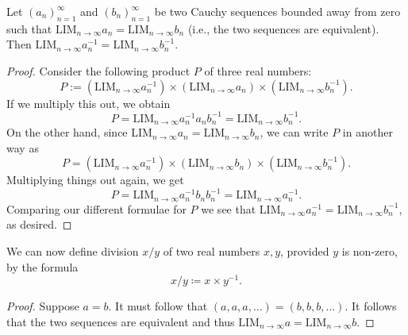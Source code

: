 {

\begin{lem}
\label{lem:reciprocation-well-defined}
Let $(a_n)_{n=1}^{\infty}$ and $(b_n)_{n=1}^{\infty}$ be two Cauchy sequences bounded away from zero such that $\mathrm{LIM}_{n\to\infty} a_n = \mathrm{LIM}_{n\to\infty} b_n$ (i.e., the two sequences are equivalent). Then $\mathrm{LIM}_{n\to\infty} a_n^{-1} = \mathrm{LIM}_{n\to\infty} b_n^{-1}$.
\end{lem}

\begin{proof}
Consider the following product $P$ of three real numbers:
\[
P := \left(\mathrm{LIM}_{n\to\infty} a_n^{-1}\right) \times \left(\mathrm{LIM}_{n\to\infty} a_n\right) \times \left(\mathrm{LIM}_{n\to\infty} b_n^{-1}\right).
\]
If we multiply this out, we obtain
\[
P = \mathrm{LIM}_{n\to\infty} a_n^{-1} a_n b_n^{-1} = \mathrm{LIM}_{n\to\infty} b_n^{-1}.
\]
On the other hand, since $\mathrm{LIM}_{n\to\infty} a_n = \mathrm{LIM}_{n\to\infty} b_n$, we can write $P$ in another way as
\[
P = \left(\mathrm{LIM}_{n\to\infty} a_n^{-1}\right) \times \left(\mathrm{LIM}_{n\to\infty} b_n\right) \times \left(\mathrm{LIM}_{n\to\infty} b_n^{-1}\right).
\]
Multiplying things out again, we get
\[
P = \mathrm{LIM}_{n\to\infty} a_n^{-1} b_n b_n^{-1} = \mathrm{LIM}_{n\to\infty} a_n^{-1}.
\]
Comparing our different formulae for $P$ we see that $\mathrm{LIM}_{n\to\infty} a_n^{-1} = \mathrm{LIM}_{n\to\infty} b_n^{-1}$, as desired.
\end{proof}

We can now define division $x/y$ of two real numbers $x,y$, provided $y$ is non-zero, by the formula
\begin{equation*}
    x/y \coloneqq x \times y^{-1}.
\end{equation*}

\begin{proof}
    Suppose $a=b$. It must follow that $(a,a,a,...)=(b,b,b,...)$. It follows that the two sequences are equivalent and thus $\mathrm{LIM}_{n\to\infty} a = \mathrm{LIM}_{n\to\infty} b$. 


\end{proof}}
